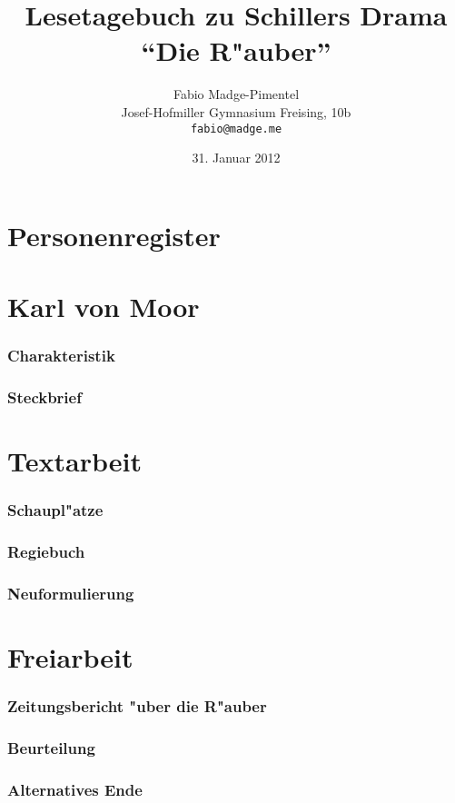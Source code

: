 \documentclass[a4paper, titlepage, draft]{article}
\author{Fabio Madge-Pimentel\\
	Josef-Hofmiller Gymnasium Freising, 10b\\
	\texttt{fabio@madge.me}}
\title{Lesetagebuch zu Schillers Drama "`Die R"auber"'}
\date{31. Januar 2012}
\begin{document}
\maketitle

\tableofcontents
\newpage

\part{Personenregister}
	
\part{Karl von Moor}
	\section{Charakteristik}
		
	\section{Steckbrief}
		
\part{Textarbeit}
	\section{Schaupl"atze}
		
	\section{Regiebuch}
		
	\section{Neuformulierung}
		
\part{Freiarbeit}
	\section{Zeitungsbericht "uber die R"auber}
		
	\section{Beurteilung}
		
	\section{Alternatives Ende}
		
\end{document}
